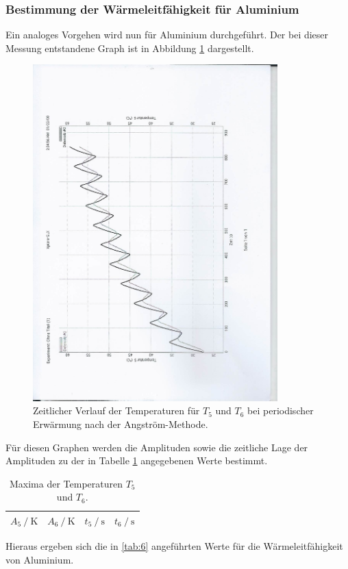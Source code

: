 \subsubsection{Bestimmung der Wärmeleitfähigkeit für Aluminium}
Ein analoges Vorgehen wird nun für Aluminium durchgeführt.
Der bei dieser Messung entstandene Graph ist in Abbildung \ref{fig:6} dargestellt.
\begin{figure}[H]
  \centering
  \includegraphics[height=13cm, angle=270]{scan-2.jpg}
  \caption{Zeitlicher Verlauf der Temperaturen für $T_5$ und $T_6$ bei periodischer Erwärmung nach der Angström-Methode.}
  \label{fig:6}
\end{figure}
Für diesen Graphen werden die Amplituden sowie die zeitliche Lage der Amplituden zu der in Tabelle \ref{tab:5} angegebenen Werte bestimmt.
\begin{table}
  \centering
  \caption{Maxima der Temperaturen $T_5$ und $T_6$.}
  \label{tab:5}
  \begin{tabular}{c c c c}
    \toprule
    {$A_5 \:/\: \si{\kelvin}$} & {$A_6 \:/\: \si{\kelvin}$}  & {$t_5 \:/\: \si{\second}$}  & {$t_6 \:/\: \si{\second}$}\\
    \midrule
    
    \bottomrule
  \end{tabular}
\end{table}
Hieraus ergeben sich die in \ref{tab:6} angeführten Werte für die Wärmeleitfähigkeit von Aluminium.
